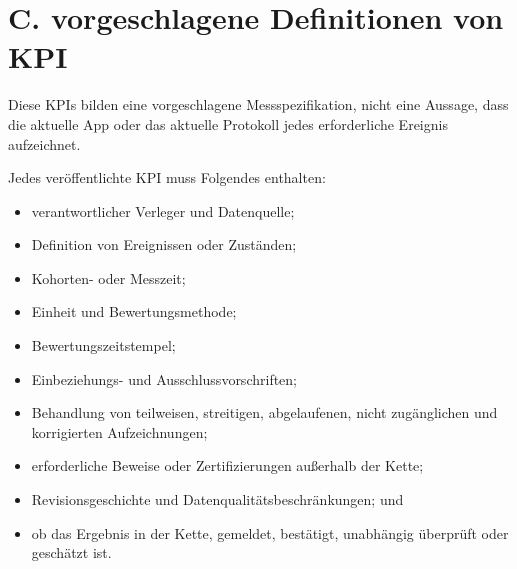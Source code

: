\documentclass[11pt]{article}
\begin{document}
\section*{C. vorgeschlagene Definitionen von KPI}

Diese KPIs bilden eine vorgeschlagene Messspezifikation, nicht eine Aussage, dass die aktuelle App oder das aktuelle Protokoll jedes erforderliche Ereignis aufzeichnet.

Jedes veröffentlichte KPI muss Folgendes enthalten:

\begin{itemize}[leftmargin=*]
\item verantwortlicher Verleger und Datenquelle;
\item Definition von Ereignissen oder Zuständen;
\item Kohorten- oder Messzeit;
\item Einheit und Bewertungsmethode;
\item Bewertungszeitstempel;
\item Einbeziehungs- und Ausschlussvorschriften;
\item Behandlung von teilweisen, streitigen, abgelaufenen, nicht zugänglichen und korrigierten Aufzeichnungen;
\item erforderliche Beweise oder Zertifizierungen außerhalb der Kette;
\item Revisionsgeschichte und Datenqualitätsbeschränkungen; und
\item ob das Ergebnis in der Kette, gemeldet, bestätigt, unabhängig überprüft oder geschätzt ist.
\end{itemize}
\end{document}
